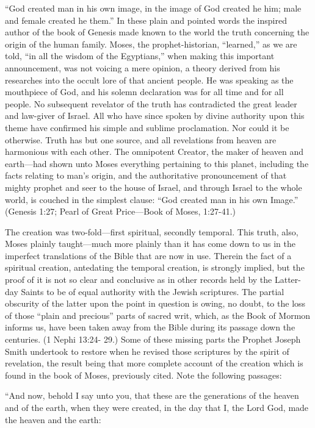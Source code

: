 ``God created man in his own image, in the image of God created he him; male and female
created he them.'' In these plain and pointed words the inspired author of the book of Genesis
made known to the world the truth concerning the origin of the human family. Moses, the
prophet-historian, ``learned,'' as we are told, ``in all the wisdom of the Egyptians,'' when
making this important announcement, was not voicing a mere opinion, a theory derived from
his researches into the occult lore of that ancient people. He was speaking as the mouthpiece
of God, and his solemn declaration was for all time and for all people. No subsequent
revelator of the truth has contradicted the great leader and law-giver of Israel. All who have
since spoken by divine authority upon this theme have confirmed his simple and sublime
proclamation. Nor could it be otherwise. Truth has but one source, and all revelations from
heaven are harmonious with each other. The omnipotent Creator, the maker of heaven and
earth—had shown unto Moses everything pertaining to this planet, including the facts
relating to man's origin, and the authoritative pronouncement of that mighty prophet and seer
to the house of Israel, and through Israel to the whole world, is couched in the simplest
clause: ``God created man in his own Image.'' (Genesis 1:27; Pearl of Great Price—Book of
Moses, 1:27-41.)

The creation was two-fold—first spiritual, secondly temporal. This truth, also, Moses plainly
taught—much more plainly than it has come down to us in the imperfect translations of the
Bible that are now in use. Therein the fact of a spiritual creation, antedating the temporal
creation, is strongly implied, but the proof of it is not so clear and conclusive as in other
records held by the Latter-day Saints to be of equal authority with the Jewish scriptures. The
partial obscurity of the latter upon the point in question is owing, no doubt, to the loss of
those ``plain and precious'' parts of sacred writ, which, as the Book of Mormon informs us,
have been taken away from the Bible during its passage down the centuries. (1 Nephi 13:24-
29.) Some of these missing parts the Prophet Joseph Smith undertook to restore when he
revised those scriptures by the spirit of revelation, the result being that more complete
account of the creation which is found in the book of Moses, previously cited. Note the
following passages:

``And now, behold I say unto you, that these are the generations of the heaven and of the
earth, when they were created, in the day that I, the Lord God, made the heaven and the
earth:

